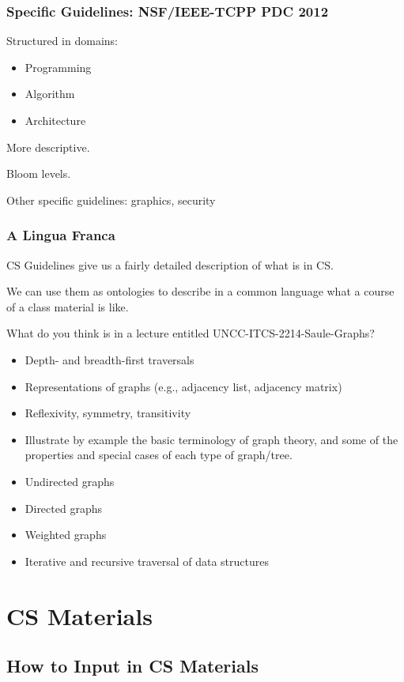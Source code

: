 \documentclass[aspectratio=169]{beamer}
\begin{document}
\begin{frame}
  \frametitle{Specific Guidelines: NSF/IEEE-TCPP PDC 2012}

  Structured in domains:
  \begin{itemize}
  \item Programming
  \item Algorithm
  \item Architecture
  \end{itemize}

  More descriptive.

  Bloom levels.

  Other specific guidelines: graphics, security  
\end{frame}


\begin{frame}
  \frametitle{A Lingua Franca}

  CS Guidelines give us a fairly detailed description of what is in CS.

  We can use them as ontologies to describe in a common language what
  a course of a class material is like.

  \begin{block}{What do you think is in a lecture entitled UNCC-ITCS-2214-Saule-Graphs?}
    \tiny
  \begin{itemize} 
    \item Depth- and breadth-first traversals
    \item Representations of graphs (e.g., adjacency list, adjacency matrix)
    \item Reflexivity, symmetry, transitivity
    \item Illustrate by example the basic terminology of graph theory, and some of the properties and special cases of each type of graph/tree.
    \item Undirected graphs
    \item Directed graphs
    \item Weighted graphs
    \item Iterative and recursive traversal of data structures
  \end{itemize}
  \end{block}
\end{frame}


\section{CS Materials}

\subsection{How to Input in CS Materials}
\end{document}
